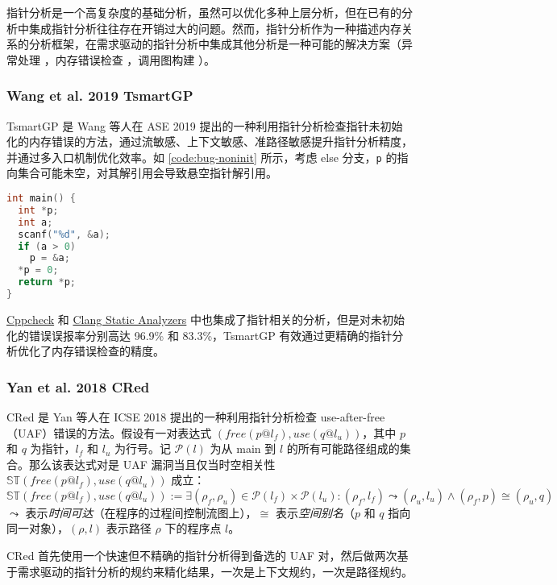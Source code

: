 \renewcommand{\refname}{\small}
\begin{bibunit}

指针分析是一个高复杂度的基础分析，虽然可以优化多种上层分析，但在已有的分析中集成指针分析往往存在开销过大的问题。然而，指针分析作为一种描述内存关系的分析框架，在需求驱动的指针分析中集成其他分析是一种可能的解决方案（异常处理 \cite{bravenboer2009b,kastrinis2013a}，内存错误检查 \cite{yan2018,wang2019}，调用图构建 \cite{smaragdakis2015}）。

\subsubsection{Wang et al. 2019 TsmartGP}

TsmartGP \cite{wang2019} 是 Wang 等人在 ASE 2019 提出的一种利用指针分析检查指针未初始化的内存错误的方法，通过流敏感、上下文敏感、准路径敏感提升指针分析精度，并通过多入口机制优化效率。如 \autoref{code:bug-noninit} 所示，考虑 else 分支，\texttt{p} 的指向集合可能未空，对其解引用会导致悬空指针解引用。

\begin{lstfloat}
\begin{lstlisting}[language={C},caption={指针未初始化错误例子},label={code:bug-noninit}]
int main() {
  int *p;
  int a;
  scanf("%d", &a);
  if (a > 0)
    p = &a;
  *p = 0;
  return *p;
}
\end{lstlisting}
\end{lstfloat}

\href{https://cppcheck.sourceforge.io}{Cppcheck} 和 \href{https://clang-analyzer.llvm.org/available_checks.html}{Clang Static Analyzers} 中也集成了指针相关的分析，但是对未初始化的错误误报率分别高达 96.9\% 和 83.3\%，TsmartGP 有效通过更精确的指针分析优化了内存错误检查的精度。

\subsubsection{Yan et al. 2018 CRed}

CRed \cite{yan2018} 是 Yan 等人在 ICSE 2018 提出的一种利用指针分析检查 use-after-free（UAF）错误的方法。假设有一对表达式 $(free(p@l_f),use(q@l_u))$，其中 $p$ 和 $q$ 为指针，$l_f$ 和 $l_u$ 为行号。记 $\mathcal{P}(l)$ 为从 main 到 $l$ 的所有可能路径组成的集合。那么该表达式对是 UAF 漏洞当且仅当时空相关性 $\mathbb{ST}(free(p@l_f),use(q@l_u))$ 成立：
%
$$
\mathbb{ST}(free(p@l_f),use(q@l_u)) := \exists (\rho_f,\rho_u) \in \mathcal{P}(l_f) \times \mathcal{P}(l_u) : (\rho_f,l_f) \leadsto (\rho_u,l_u) \wedge (\rho_f,p) \cong (\rho_u,q)
$$
%
$\leadsto$ 表示\emph{时间可达}（在程序的过程间控制流图上），$\cong$ 表示\emph{空间别名}（$p$ 和 $q$ 指向同一对象），$(\rho,l)$ 表示路径 $\rho$ 下的程序点 $l$。

CRed 首先使用一个快速但不精确的指针分析得到备选的 UAF 对，然后做两次基于需求驱动的指针分析的规约来精化结果，一次是上下文规约，一次是路径规约。

\small
{}
\end{bibunit}

